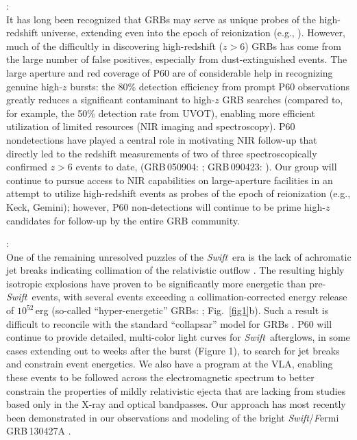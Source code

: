 \documentclass[letterpaper,11pt]{article}
\newcommand{\swift}{\textit{Swift}}
\begin{document}
:
\smallskip\\
It has long been recognized that GRBs may serve as unique probes of
the high-redshift universe, extending even into the epoch
of reionization (e.g., \citealt{lr00}).  However, much of the 
difficultly in discovering high-redshift ($z > 6$) GRBs  
has come from the large number of false positives, especially from 
dust-extinguished events.  The large aperture and red coverage 
of P60 are of considerable help in recognizing genuine high-$z$ bursts:  
the 80\% detection efficiency from prompt P60 observations 
greatly reduces a significant contaminant to high-$z$ GRB searches 
(compared to, for example, the 50\% detection rate from UVOT), enabling 
more efficient utilization of limited resources (NIR imaging and spectroscopy).  
P60 nondetections have played a central role in motivating NIR follow-up that 
directly led to the redshift measurements of two of three spectroscopically 
confirmed $z>6$ events to date, (GRB\,050904: \citealt{hnr+06}; GRB\,090423: 
\citealt{trl+09}).  Our group will continue to pursue access to NIR capabilities
on large-aperture facilities in an attempt to utilize high-redshift
events as probes of the epoch of reionization (e.g., Keck, Gemini); however, 
P60 non-detections will continue to be prime high-$z$ candidates for 
follow-up by the entire GRB community.

:
\smallskip\\
One of the remaining unresolved puzzles of the \swift\ era is the lack
of achromatic jet breaks indicating collimation of the relativistic outflow
\citep{kb08,rlb+09,p07}.  The resulting highly isotropic explosions have
proven to be significantly more energetic than pre-\swift\ events, with
several events exceeding a collimation-corrected energy release of
$10^{52}$\,erg (so-called ``hyper-energetic'' GRBs: \citealt{ccf+08,ckh+06};
Fig.~\ref{fig1}b).  Such a result is difficult to reconcile with the
standard ``collapsar'' model for GRBs \citep{woo93}.  
P60  will continue to provide 
detailed, multi-color light curves for \swift\ afterglows, in some cases extending 
out to weeks after the burst (Figure 1), to search for jet breaks and constrain event energetics.  
We also have a program at the VLA, enabling these events to be followed
across the electromagnetic spectrum to better constrain the properties of mildly 
relativistic ejecta that are lacking from studies based only in the X-ray and 
optical bandpasses.  Our approach has most recently been demonstrated in our
observations and modeling of the bright \swift/{\emph Fermi} GRB\,130427A \citep{pcc+2013}.
\end{document}
